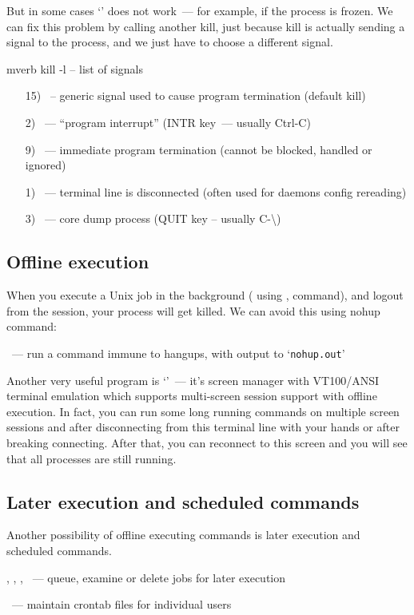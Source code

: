 But in some cases `' does not work~--- for example, if the process is
frozen. We can fix this problem by calling another kill, just because
kill is actually sending a signal to the process, and we just have to
choose a different signal.
\begin{code}{mverb}
kill -l -- list of signals
\end{code}

\begin{itemize}
\item[15)] ~-- generic signal used to cause program termination
(default kill)\\
\item[2)] ~--- ``program interrupt'' (INTR key~--- usually Ctrl-C)
\item[9)] ~--- immediate program termination (cannot be blocked,
handled or ignored)
\item[1)] ~--- terminal line is disconnected (often used for daemons
config rereading)
\item[3)] ~--- core dump process (QUIT key -- usually C-\textbackslash)
\end{itemize}

\subsection*{Offline execution}

When you execute a Unix job in the background ( using \cmd{\&},  command),
and logout from the session, your process will get killed.
We can avoid this using nohup command:

~--- run a command immune to hangups,
with output to `{\tt nohup.out}'

Another very useful program is `'~--- it's screen manager with
VT100/ANSI terminal emulation which supports multi-screen session support
with offline execution. In fact, you can run some long running commands
on multiple screen sessions and after disconnecting from this terminal
line with your hands or after breaking connecting. After that, you can
reconnect to this screen and you will see that all processes are still running.

\subsection*{Later execution and scheduled commands}

Another possibility of offline executing commands is later execution and
scheduled commands.

, , , ~--- queue, examine or delete jobs
for later execution

~--- maintain crontab files for individual users
